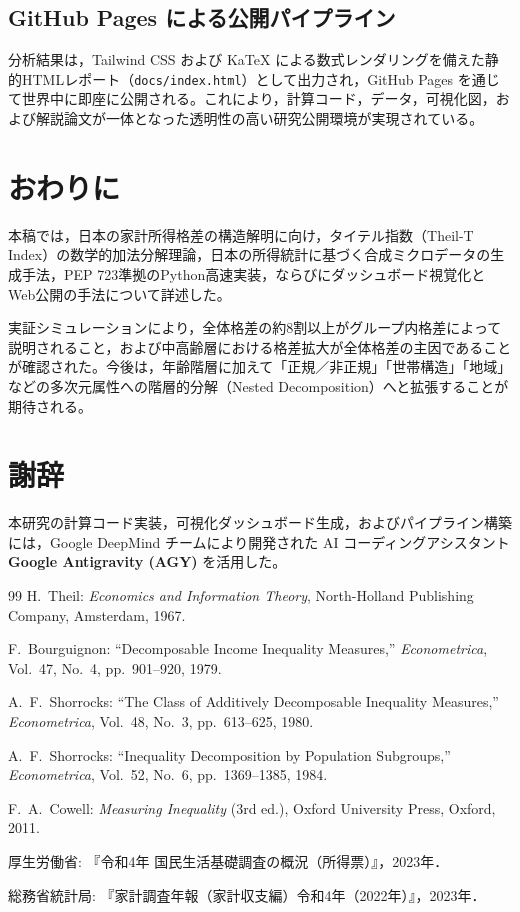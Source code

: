 \documentclass[paper=a4,fontsize=10.5pt,line_length=42zw]{jlreq}
\begin{document}
\subsection{GitHub Pages による公開パイプライン}
分析結果は，Tailwind CSS および KaTeX による数式レンダリングを備えた静的HTMLレポート（\texttt{docs/index.html}）として出力され，GitHub Pages を通じて世界中に即座に公開される。これにより，計算コード，データ，可視化図，および解説論文が一体となった透明性の高い研究公開環境が実現されている。

\section{おわりに}
本稿では，日本の家計所得格差の構造解明に向け，タイテル指数（Theil-T Index）の数学的加法分解理論，日本の所得統計に基づく合成ミクロデータの生成手法，PEP 723準拠のPython高速実装，ならびにダッシュボード視覚化とWeb公開の手法について詳述した。

実証シミュレーションにより，全体格差の約8割以上がグループ内格差によって説明されること，および中高齢層における格差拡大が全体格差の主因であることが確認された。今後は，年齢階層に加えて「正規／非正規」「世帯構造」「地域」などの多次元属性への階層的分解（Nested Decomposition）へと拡張することが期待される。

\section*{謝辞}
本研究の計算コード実装，可視化ダッシュボード生成，およびパイプライン構築には，Google DeepMind チームにより開発された AI コーディングアシスタント \textbf{Google Antigravity (AGY)} を活用した。


\begin{thebibliography}{99}
H.~Theil: \emph{Economics and Information Theory}, North-Holland Publishing Company, Amsterdam, 1967.

F.~Bourguignon: ``Decomposable Income Inequality Measures,'' \emph{Econometrica}, Vol.~47, No.~4, pp.~901--920, 1979.

A.~F.~Shorrocks: ``The Class of Additively Decomposable Inequality Measures,'' \emph{Econometrica}, Vol.~48, No.~3, pp.~613--625, 1980.

A.~F.~Shorrocks: ``Inequality Decomposition by Population Subgroups,'' \emph{Econometrica}, Vol.~52, No.~6, pp.~1369--1385, 1984.

F.~A.~Cowell: \emph{Measuring Inequality} (3rd ed.), Oxford University Press, Oxford, 2011.

厚生労働省: 『令和4年 国民生活基礎調査の概況（所得票）』，2023年．

総務省統計局: 『家計調査年報（家計収支編）令和4年（2022年）』，2023年．
\end{thebibliography}
\end{document}

